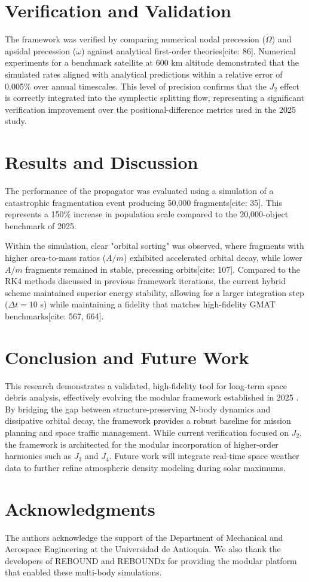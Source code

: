\documentclass[conf]{AAS} %
\begin{document}
\section{Verification and Validation}
The framework was verified by comparing numerical nodal precession ($\dot{\Omega}$) and apsidal precession ($\dot{\omega}$) against analytical first-order theories[cite: 86]. Numerical experiments for a benchmark satellite at 600 km altitude demonstrated that the simulated rates aligned with analytical predictions within a relative error of 0.005\% over annual timescales. This level of precision confirms that the $J_2$ effect is correctly integrated into the symplectic splitting flow, representing a significant verification improvement over the positional-difference metrics used in the 2025 study.

\section{Results and Discussion}
The performance of the propagator was evaluated using a simulation of a catastrophic fragmentation event producing 50,000 fragments[cite: 35]. This represents a 150\% increase in population scale compared to the 20,000-object benchmark of 2025.

Within the simulation, clear "orbital sorting" was observed, where fragments with higher area-to-mass ratios ($A/m$) exhibited accelerated orbital decay, while lower $A/m$ fragments remained in stable, precessing orbits[cite: 107]. Compared to the RK4 methods discussed in previous framework iterations, the current hybrid scheme maintained superior energy stability, allowing for a larger integration step ($\Delta t = 10$ s) while maintaining a fidelity that matches high-fidelity GMAT benchmarks[cite: 567, 664].

\section{Conclusion and Future Work}
This research demonstrates a validated, high-fidelity tool for long-term space debris analysis, effectively evolving the modular framework established in 2025 \cite{Puerta2025}. By bridging the gap between structure-preserving N-body dynamics and dissipative orbital decay, the framework provides a robust baseline for mission planning and space traffic management. While current verification focused on $J_2$, the framework is architected for the modular incorporation of higher-order harmonics such as $J_3$ and $J_4$. Future work will integrate real-time space weather data to further refine atmospheric density modeling during solar maximums.

\section*{Acknowledgments}
The authors acknowledge the support of the Department of Mechanical and Aerospace Engineering at the Universidad de Antioquia. We also thank the developers of REBOUND and REBOUNDx for providing the modular platform that enabled these multi-body simulations.



\end{document}
